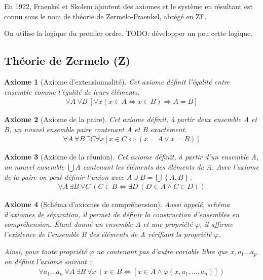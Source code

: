 \documentclass[10pt,a4paper]{article}
\newtheorem{axiom}{Axiome}
\begin{document}
En 1922, Fraenkel et Skolem ajoutent des axiomes et le système en résultant est connu sous le nom de théorie de Zermelo-Fraenkel, abrégé en ZF.

On utilise la logique du premier ordre.
TODO: développer un peu cette logique.

\subsection{Théorie de Zermelo (Z)}

\begin{axiom}[Axiome d'extensionnalité] Cet axiome définit l'égalité entre ensemble comme l'égalité de leurs éléments.
\begin{align}
\forall A\ \forall B \
\left[ 
\forall x \left( x \in A \Leftrightarrow x \in B  \right) \Rightarrow A = B
\right] 
\end{align}
\end{axiom}

\begin{axiom}[Axiome de la paire] Cet axiome définit, à partir deux ensemble A et B, un nouvel ensemble paire contenant A et B exactement.
\begin{align}
\forall A \ \forall B \ \exists C \forall x \left[ x \in C \Leftrightarrow \left( x = A \vee x = B \right) \right]
\end{align}
\end{axiom}

\begin{axiom}[Axiome de la réunion] Cet axiome définit, à partir d'un ensemble A, un nouvel ensemble $\bigcup A$ contenant les éléments des éléments de A. Avec l'axiome de la paire on peut définir l'union avec $A \cup B = \bigcup \left\{A, B\right\}$.
\begin{align}
\forall A\ \exists B\ \forall C\ \left( C\in B \Leftrightarrow \exists D\ \left( D\in A \wedge C\in D \right) \right)
\end{align}
\end{axiom}


\begin{axiom}[Schéma d'axiomes de compréhension] Aussi appelé, schéma d'axiomes de séparation, il permet de définir la construction d'ensembles en compréhension. Étant donné un ensemble $A$ et une propriété $\varphi$, il affirme l'existence de l'ensemble B des éléments de A vérifiant la propriété $\varphi$.

Ainsi, pour toute propriété $\varphi$ ne contenant pas d'autre variable libre que $x, a_1 \ldots a_p$ on définit l'axiome suivant :
\begin{align}
\forall a_1 \ldots a_n \ \forall A \ \exists B \ \forall x \ \left( x \in B \Leftrightarrow \left[ x \in A \wedge \varphi \left(x, a_1, \ldots, a_n \right) \right] \right) 
\end{align}
\end{axiom}
\end{document}
